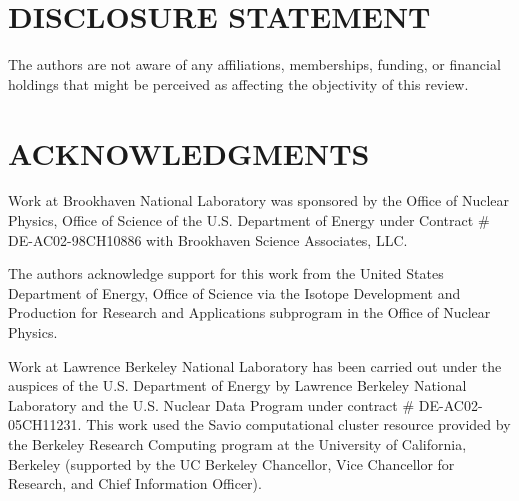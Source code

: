 \documentclass[letterpaper]{ar-1col}
\begin{document}
% 
% 

\section*{DISCLOSURE STATEMENT}
The authors are not aware of any affiliations, memberships, funding, or financial holdings that
might be perceived as affecting the objectivity of this review. 

\section*{ACKNOWLEDGMENTS}
Work at Brookhaven National Laboratory was sponsored by the Office of Nuclear Physics, Office of Science of the U.S. Department of Energy under Contract \# DE-AC02-98CH10886 with Brookhaven Science Associates, LLC.

The authors acknowledge support for this work from the United States Department of Energy, Office of Science via the Isotope Development and Production for Research and Applications subprogram in the Office of Nuclear Physics. 

Work at Lawrence Berkeley National Laboratory has been carried out  under the auspices of the U.S. Department of Energy by  Lawrence Berkeley National Laboratory and the U.S. Nuclear Data Program under contract \# DE-AC02-05CH11231. This work used the Savio computational cluster resource provided by the Berkeley Research Computing program at the University of California, Berkeley (supported by the UC Berkeley Chancellor, Vice Chancellor for Research, and Chief Information Officer).
\end{document}
